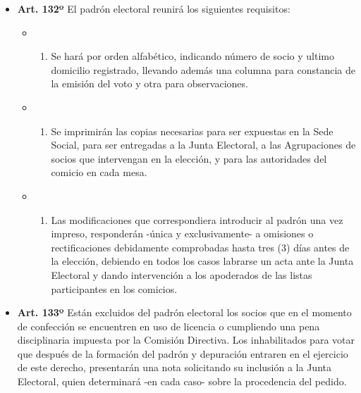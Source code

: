 \documentclass[openany]{book}
\providecommand{\tightlist}{%
  \setlength{\itemsep}{0pt}\setlength{\parskip}{0pt}}
\begin{document}
\begin{itemize}
\tightlist
\item
  \textbf{Art. 132º}
  El padrón electoral reunirá los siguientes requisitos:

  \begin{itemize}
  \item
    \begin{enumerate}
    \def\labelenumi{\alph{enumi})}
    \tightlist
    \item
      Se hará por orden alfabético, indicando número de socio y ultimo domicilio registrado, llevando además una columna para constancia de la emisión del voto y otra para observaciones.
    \end{enumerate}
  \item
    \begin{enumerate}
    \def\labelenumi{\alph{enumi})}
    \setcounter{enumi}{1}
    \tightlist
    \item
      Se imprimirán las copias necesarias para ser expuestas en la Sede Social, para ser entregadas a la Junta Electoral, a las Agrupaciones de socios que intervengan en la elección, y para las autoridades del comicio en cada mesa.
    \end{enumerate}
  \item
    \begin{enumerate}
    \def\labelenumi{\alph{enumi})}
    \setcounter{enumi}{2}
    \tightlist
    \item
      Las modificaciones que correspondiera introducir al padrón una vez impreso, responderán -única y exclusivamente- a omisiones o rectificaciones debidamente comprobadas hasta tres (3) días antes de la elección, debiendo en todos los casos labrarse un acta ante la Junta Electoral y dando intervención a los apoderados de las listas participantes en los comicios.
    \end{enumerate}
  \end{itemize}
\end{itemize}

\begin{itemize}
\tightlist
\item
  \textbf{Art. 133º}
  Están excluidos del padrón electoral los socios que en el momento de confección se encuentren en uso de licencia o cumpliendo una pena disciplinaria impuesta por la Comisión Directiva. Los inhabilitados para votar que después de la formación del padrón y depuración entraren en el ejercicio de este derecho, presentarán una nota solicitando su inclusión a la Junta Electoral, quien determinará -en cada caso- sobre la procedencia del pedido.
\end{itemize}
\end{document}
